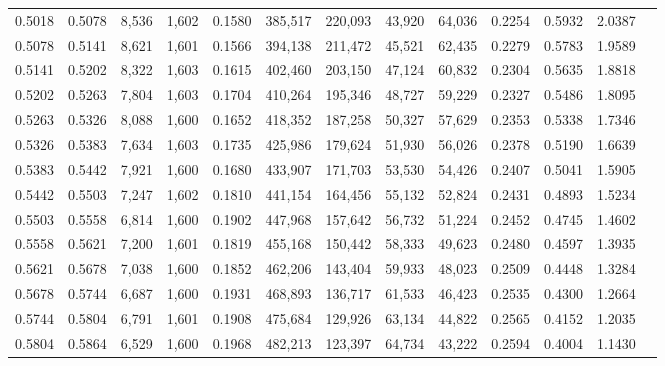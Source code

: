 \begin{tabular}{rrrrrrrrrrrrr}
0.5018 & 0.5078 &  8,536 & 1,602 &                                     0.1580 & 385,517 & 220,093 &  43,920 &  64,036 & 0.2254 & 0.5932 & 2.0387 \\
0.5078 & 0.5141 &  8,621 & 1,601 &                                     0.1566 & 394,138 & 211,472 &  45,521 &  62,435 & 0.2279 & 0.5783 & 1.9589 \\
0.5141 & 0.5202 &  8,322 & 1,603 &                                     0.1615 & 402,460 & 203,150 &  47,124 &  60,832 & 0.2304 & 0.5635 & 1.8818 \\
0.5202 & 0.5263 &  7,804 & 1,603 &                                     0.1704 & 410,264 & 195,346 &  48,727 &  59,229 & 0.2327 & 0.5486 & 1.8095 \\
0.5263 & 0.5326 &  8,088 & 1,600 &                                     0.1652 & 418,352 & 187,258 &  50,327 &  57,629 & 0.2353 & 0.5338 & 1.7346 \\
0.5326 & 0.5383 &  7,634 & 1,603 &                                     0.1735 & 425,986 & 179,624 &  51,930 &  56,026 & 0.2378 & 0.5190 & 1.6639 \\
0.5383 & 0.5442 &  7,921 & 1,600 &                                     0.1680 & 433,907 & 171,703 &  53,530 &  54,426 & 0.2407 & 0.5041 & 1.5905 \\
0.5442 & 0.5503 &  7,247 & 1,602 &                                     0.1810 & 441,154 & 164,456 &  55,132 &  52,824 & 0.2431 & 0.4893 & 1.5234 \\
0.5503 & 0.5558 &  6,814 & 1,600 &                                     0.1902 & 447,968 & 157,642 &  56,732 &  51,224 & 0.2452 & 0.4745 & 1.4602 \\
0.5558 & 0.5621 &  7,200 & 1,601 &                                     0.1819 & 455,168 & 150,442 &  58,333 &  49,623 & 0.2480 & 0.4597 & 1.3935 \\
0.5621 & 0.5678 &  7,038 & 1,600 &                                     0.1852 & 462,206 & 143,404 &  59,933 &  48,023 & 0.2509 & 0.4448 & 1.3284 \\
0.5678 & 0.5744 &  6,687 & 1,600 &                                     0.1931 & 468,893 & 136,717 &  61,533 &  46,423 & 0.2535 & 0.4300 & 1.2664 \\
0.5744 & 0.5804 &  6,791 & 1,601 &                                     0.1908 & 475,684 & 129,926 &  63,134 &  44,822 & 0.2565 & 0.4152 & 1.2035 \\
0.5804 & 0.5864 &  6,529 & 1,600 &                                     0.1968 & 482,213 & 123,397 &  64,734 &  43,222 & 0.2594 & 0.4004 & 1.1430 \\

\end{tabular}
